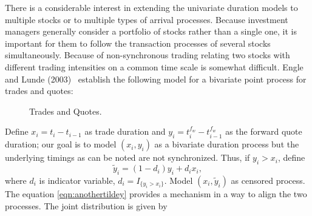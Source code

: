 There is a considerable interest in extending the univariate duration models to multiple stocks or to multiple types of arrival processes. Because investment managers generally consider a portfolio of stocks rather than a single one, it is important for them to follow the transaction processes of several stocks simultaneously. Because of non-synchronous trading relating two stocks with different trading intensities on a common time scale is somewhat difficult. Engle and Lunde (2003)~\cite{englelunde} establish the following model for a bivariate point process for trades and quotes:
	\begin{figure}[!ht]
	\centering
	\caption{Trades and Quotes.\label{fig:tradeactdoubline}}
	\end{figure}
Define $x_i = t_i - t_{i-1}$ as trade duration and $y_i = t_i^{f_w} - t_{i-1}^{f_w}$ as the forward quote duration; our goal is to model $(x_i,y_i)$ as a bivariate duration process but the underlying timings as can be noted are not synchronized. Thus, if $y_i > x_i$, define
	\begin{equation} \label{eqn:anothertildey}
	\widetilde{y}_i = (1 - d_i)y_i + d_ix_i,
	\end{equation}
where $d_i$ is indicator variable, $d_i = I_{\{y_i>x_i\}}$. Model $(x_i,\widetilde{y}_i)$ as censored process. The equation \eqref{eqn:anothertildey} provides a mechanism in a way to align the two processes. The joint distribution is given by
